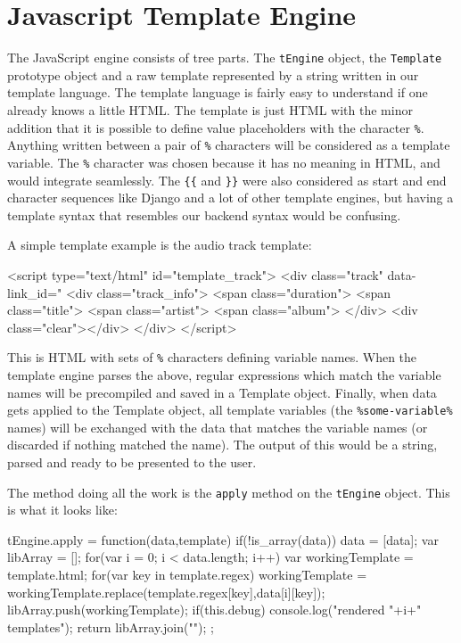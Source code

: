 \section{Javascript Template Engine}

The JavaScript engine consists of tree parts. The 
\lstinline$tEngine$ object, the \lstinline$Template$ prototype object 
and a raw template represented by a string written in our template language. 
The template language is fairly easy to understand if one already knows a little HTML. 
The template is just HTML with the minor addition that it is possible to define value placeholders with the character \verb$%$. 
Anything written between a pair of \verb$%$ characters will be considered as a template variable. 
The \verb$%$ character was chosen because it has no meaning in HTML, and would integrate seamlessly. 
The \verb${{$ and \verb$}}$ were also considered as start and end character 
sequences like Django and a lot of other template engines, 
but having a template syntax that resembles our backend syntax would be confusing.

A simple template example is the audio track template:

\begin{snippet}[language=HTML,caption=The template used to represent audio tracks]
<script type="text/html" id="template_track">
	<div class="track" data-link_id="%
		<div class="track_info">
			<span class="duration">%
			<span class="title">%
			<span class="artist">%
			<span class="album">%
		</div>
		<div class="clear"></div>
	</div>
</script>
\end{snippet}
 
This is HTML with sets of \verb$%$ characters defining variable names. 
When the template engine parses the above, regular expressions which match the variable names will be precompiled and saved in a Template object. 
Finally, when data gets applied to the Template object, 
all template variables (the \verb$%some-variable%$ names) will be exchanged with 
the data that matches the variable names (or discarded if nothing matched the name).
The output of this would be a string, parsed and ready to be presented to the user.


The method doing all the work is the \verb$apply$ method on the \verb$tEngine$ object.
This is what it looks like:


\begin{snippet}[language=JavaScript,caption=The javascript engine apply method]
tEngine.apply = function(data,template) {
    if(!is_array(data)) {
        data = [data];
    }
    var libArray = [];
    for(var i = 0; i < data.length; i++) {
        var workingTemplate = template.html;
        for(var key in template.regex) {
            workingTemplate = workingTemplate.replace(template.regex[key],data[i][key]);
        }
        libArray.push(workingTemplate);
    }
	if(this.debug) {
		console.log("rendered "+i+" templates");
	}
    return libArray.join("\n");
};
\end{snippet}

